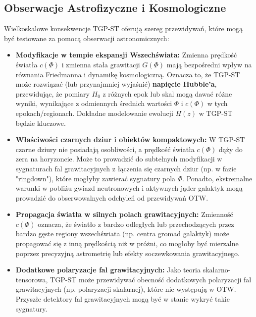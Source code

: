 \documentclass[11pt,a4paper]{article}
\begin{document}
\subsection{Obserwacje Astrofizyczne i Kosmologiczne}
Wielkoskalowe konsekwencje TGP-ST oferują szereg przewidywań, które mogą być testowane za pomocą obserwacji astronomicznych:
\begin{itemize}
    \item \textbf{Modyfikacje w tempie ekspansji Wszechświata:} Zmienna prędkość światła $c(\Phi)$ i zmienna stała grawitacji $G(\Phi)$ mają bezpośredni wpływ na równania Friedmanna i dynamikę kosmologiczną. Oznacza to, że TGP-ST może rozwiązać (lub przynajmniej wyjaśnić) \textbf{napięcie Hubble'a}, przewidując, że pomiary $H_0$ z różnych epok lub skal mogą dawać różne wyniki, wynikające z odmiennych średnich wartości $\Phi$ i $c(\Phi)$ w tych epokach/regionach. Dokładne modelowanie ewolucji $H(z)$ w TGP-ST będzie kluczowe.
    \item \textbf{Właściwości czarnych dziur i obiektów kompaktowych:} W TGP-ST czarne dziury nie posiadają osobliwości, a prędkość światła $c(\Phi)$ dąży do zera na horyzoncie. Może to prowadzić do subtelnych modyfikacji w sygnaturach fal grawitacyjnych z łączenia się czarnych dziur (np. w fazie "ringdown"), które mogłyby zawierać sygnatury pola $\Phi$. Ponadto, ekstremalne warunki w pobliżu gwiazd neutronowych i aktywnych jąder galaktyk mogą prowadzić do obserwowalnych odchyleń od przewidywań OTW.
    \item \textbf{Propagacja światła w silnych polach grawitacyjnych:} Zmienność $c(\Phi)$ oznacza, że światło z bardzo odległych lub przechodzących przez bardzo gęste regiony wszechświata (np. centra gromad galaktyk) może propagować się z inną prędkością niż w próżni, co mogłoby być mierzalne poprzez precyzyjną astrometrię lub efekty soczewkowania grawitacyjnego.
    \item \textbf{Dodatkowe polaryzacje fal grawitacyjnych:} Jako teoria skalarno-tensorowa, TGP-ST może przewidywać obecność dodatkowych polaryzacji fal grawitacyjnych (np. polaryzacji skalarnej), które nie występują w OTW. Przyszłe detektory fal grawitacyjnych mogą być w stanie wykryć takie sygnatury.
\end{itemize}
\end{document}

